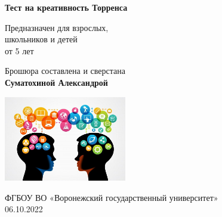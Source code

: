 \begin{landscape}
\begin{multicols}{3}
\begin{center}
{        \textbf{Тест на креативность Торренса}
 
        \vspace{1cm}
        Предназначен для взрослых,\\
        школьников
        и детей \\от 5 лет
             
        \vspace{2cm}
        Брошюра составлена и сверстана\\
        \textbf{Суматохиной Александрой}

 
        \vfill
                        
        \vspace{0.5cm}

        \includegraphics[width=0.4\textwidth]{page.jpg}
             
        \vspace{0.5cm}
        
        ФГБОУ ВО «Воронежский государственный университет»\\
        06.10.2022}
        \vspace*{2cm}
             
    \end{center}
\end{multicols} 
\end{landscape}
